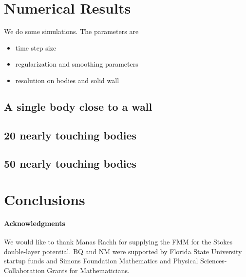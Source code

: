 \documentclass[preprint, 10pt]{elsarticle}
\begin{document}
\section{Numerical Results}
\label{s:results}
We do some simulations.  The parameters are
\begin{itemize}
  \item time step size
  \item regularization and smoothing parameters
  \item resolution on bodies and solid wall
\end{itemize}

\subsection{A single body close to a wall}

\subsection{20 nearly touching bodies}

\subsection{50 nearly touching bodies}

\section{Conclusions}
\label{s:conclusions}


\paragraph{\bf Acknowledgments} We would like to thank Manas Rachh for
supplying the FMM for the Stokes double-layer potential. BQ and NM were
supported by Florida State University startup funds and Simons
Foundation Mathematics and Physical Sciences-Collaboration Grants for
Mathematicians.

 

\end{document}
